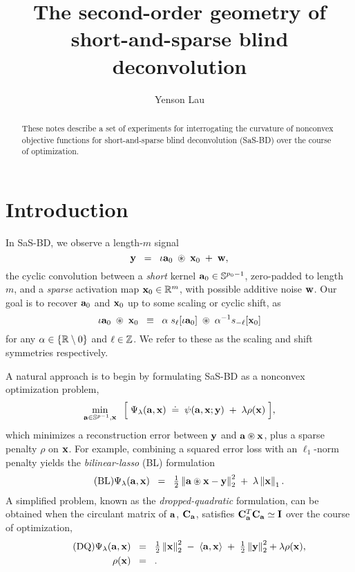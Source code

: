 \documentclass{article}
\title{The second-order geometry of \\ short-and-sparse blind deconvolution}
\author{Yenson Lau}
\numberwithin{equation}{section}
\begin{document}
\maketitle

\begin{abstract}
  These notes describe a set of experiments for interrogating the curvature of nonconvex objective functions for short-and-sparse blind deconvolution (SaS-BD) over the course of optimization.
\end{abstract}

\section{Introduction}
In SaS-BD, we observe a length-$m$ signal
\begin{equation*}
  \mathbf{y} \;\;=\;\; \iota\mathbf{a}_0 \;\circledast\; \mathbf{x}_0 \;+\; \mathbf{w},
\end{equation*}
the cyclic convolution between a {\em short} kernel $\mathbf{a}_0\in\mathbb{S}^{p_0-1}$, zero-padded to length $m$, and a {\em sparse} activation map $\mathbf{x}_0\in\mathbb{R}^m$, with possible additive noise $\mathbf{w}$. Our goal is to recover $\mathbf{a}_0$ and $\mathbf{x}_0$ up to some scaling or cyclic shift, as
\begin{equation*}
  \iota\mathbf{a}_0 \;\circledast\; \mathbf{x}_0 \;\;\equiv\;\;
  \alpha\;s_\ell[\iota\mathbf{a}_0] \;\circledast\; \alpha^{-1} s_{-\ell}[\mathbf{x}_0]
\end{equation*}
for any $\alpha\in\left\{ \mathbb{R}\setminus0\right\}$ and $\ell\in\mathbb{Z}$. We refer to these as the scaling and shift symmetries respectively.

A natural approach is to begin by formulating SaS-BD as a nonconvex optimization problem,
\begin{equation} \label{eqn:obj-Psi}
  \min_{\mathbf{a} \in \mathbb{S}^{p-1}, \mathbf{x}} \;\;\Big[\;
    \Psi_\lambda(\mathbf{a}, \mathbf{x}) \;\doteq\; \psi(\mathbf{a}, \mathbf{x} ; \mathbf{y})
    \;+\; \lambda\rho(\mathbf{x})
  \;\Big],
\end{equation}
which minimizes a reconstruction error between $\mathbf{y}$ and $\mathbf{a}\circledast\mathbf{x}$, plus a sparse penalty $\rho$ on $\mathbf{x}$. For example, combining a squared error loss with an $\ell_1$-norm penalty yields the {\em bilinear-lasso} (BL) formulation
\begin{equation} \tag{BL} \label{eqn:bl}
  \Psi_\lambda(\mathbf{a},\mathbf{x}) \;\;=\;\; \tfrac12\left\lVert \mathbf{a}\circledast\mathbf{x}-\mathbf{y}\right\rVert_2^2 \;+\; \lambda\left\lVert \mathbf{x}\right\rVert_1.
\end{equation}
A simplified problem, known as the {\em dropped-quadratic} formulation, can be obtained when the circulant matrix of $\mathbf{a}$, $\mathbf{C}_{\mathbf{a}}$, satisfies $\mathbf{C}_{\mathbf{a}}^T\mathbf{C}_{\mathbf{a}} \simeq \mathbf{I}$ over the course of optimization,
\begin{align} \tag{DQ} \label{eqn:dq}
  \Psi_\lambda(\mathbf{a},\mathbf{x}) \;\;&=\;\; \tfrac12\left\lVert \mathbf{x}\right\rVert_2^2 \;-\; \left\langle \mathbf{a}, \mathbf{x}\right\rangle \;+\; \tfrac12\left\lVert \mathbf{y}\right\rVert_2^2+\lambda\rho(\mathbf{x}), \\
  \rho(\mathbf{x}) \;\;&=\;\;.
\end{align}
\end{document}
